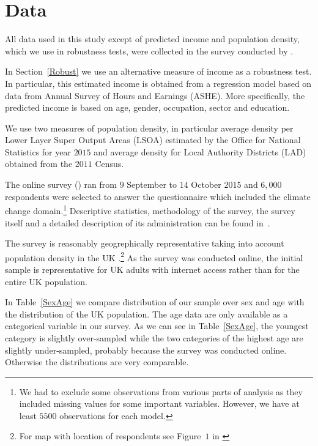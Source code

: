 \documentclass[a4paper,12pt]{article}
\begin{document}
\FloatBarrier
\section{Data}\label{Data}
All data used in this study except of predicted income and population density, which we use in robustness tests,  were collected in the survey conducted by \cite{SurveyUK}. 



In Section~\ref{Robust} we use an alternative measure of income as a robustness test. In particular, this estimated income is obtained from a regression model based on data from Annual Survey of Hours and Earnings (ASHE). More specifically, the predicted income is based on age, gender, occupation, sector and education.


We use two measures of population density, in particular average density per Lower Layer Super Output Areas (LSOA) estimated by the Office for National Statistics for year $2015$ and average density for Local Authority Districts (LAD) obtained from the $2011$ Census.




The online survey (\citealp{SurveyUK}) ran from $9$ September to $14$
October $2015$ and $6,000$ respondents were selected to answer the questionnaire which included the climate change domain.\footnote{We had to exclude some observations from various parts of analysis as they included missing values for some important variables. However, we have at least $5500$ observations for each model.} Descriptive statistics, methodology of the survey, the survey itself and a detailed description of its administration can be found in~\citet{SurveyUK}. 

The survey is reasonably geogrephically representative taking into account population density in the UK \citep{SurveyUK}.\footnote{For map with location of respondents see Figure~$1$ in \cite{SurveyUK}} As the survey was conducted online, the initial sample is representative for UK adults with internet access rather than for the entire UK population. 


In Table~\ref{SexAge} we compare distribution of our sample over sex and age  with the distribution of the UK population. The age data are only available as a categorical variable in our survey. As we can see in Table~\ref{SexAge}, the youngest category is slightly over-sampled while the two categories of the highest age are slightly under-sampled, probably because the survey was conducted online. Otherwise the distributions are very comparable.
\end{document}
